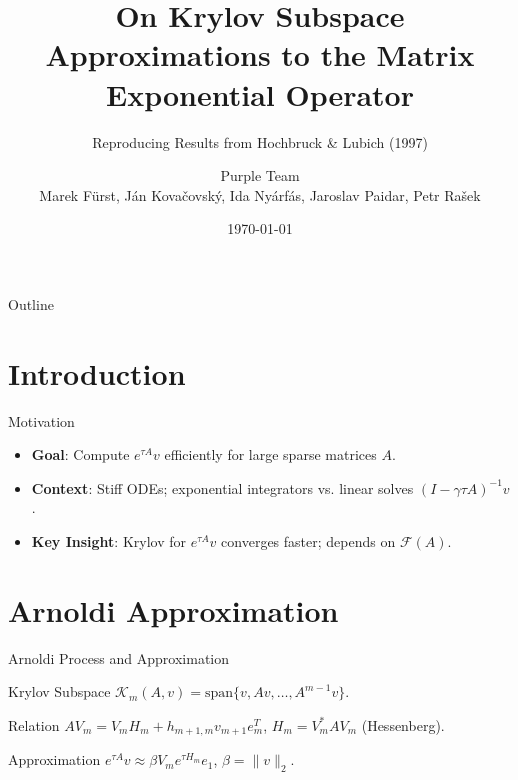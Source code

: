 \documentclass{beamer}
\title[Krylov Matrix Exponentials]{On Krylov Subspace Approximations to the Matrix Exponential Operator}
\subtitle{Reproducing Results from Hochbruck \& Lubich (1997)}
\author{Purple Team \\[0.5em] Marek Fürst, Ján Kovačovský, Ida Nyárfás, Jaroslav Paidar, Petr Rašek}
\date{\today}
\begin{document}
\begin{frame}
    \titlepage
\end{frame}

\begin{frame}{Outline}
    \tableofcontents
\end{frame}

\section{Introduction}

\begin{frame}{Motivation}
    \begin{itemize}
        \item \textbf{Goal}: Compute $e^{\tau A}v$ efficiently for large sparse matrices $A$.
        \item \textbf{Context}: Stiff ODEs; exponential integrators vs. linear solves $(I - \gamma \tau A)^{-1}v$.
        \item \textbf{Key Insight}: Krylov for $e^{\tau A}v$ converges faster; depends on $\mathcal{F}(A)$.
    \end{itemize}
\end{frame}


\section{Arnoldi Approximation}

\begin{frame}{Arnoldi Process and Approximation}
    \begin{block}{Krylov Subspace}
        $\mathcal{K}_m(A, v) = \text{span}\{v, Av, \dots, A^{m-1} v\}$.
    \end{block}
    
    \begin{block}{Relation}
        $A V_m = V_m H_m + h_{m+1,m} v_{m+1} e_m^T$, $H_m = V_m^* A V_m$ (Hessenberg).
    \end{block}

    \begin{block}{Approximation}
        $e^{\tau A}v \approx \beta V_m e^{\tau H_m} e_1$, $\beta = \|v\|_2$.
    \end{block}
\end{frame}
\end{document}
